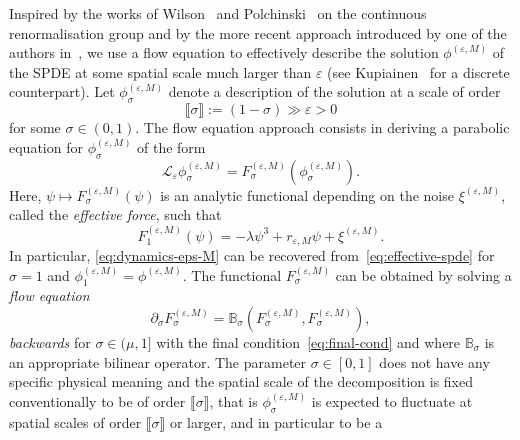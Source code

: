 \documentclass{article}
\numberwithin{equation}{section}
\newcommand{\assign}{:=}
\theoremstyle{plain}
\theoremstyle{definition}
\begin{document}
Inspired by the works of
Wilson~{\cite{wilson1971renormalization,wilson1974renormalization}} and
Polchinski~{\cite{polchinskiRenormalizationEffectiveLagrangians1984}} on the
continuous renormalisation group and by the more recent approach introduced by
one of the authors
in~{\cite{duchFlowEquationApproach2021,duchRenormalizationSingularElliptic2022}},
we use a flow equation to effectively describe the solution
$\phi^{(\varepsilon, M)}$ of the SPDE at some spatial scale much larger than
$\varepsilon$ (see Kupiainen~{\cite{kupiainen2016renormalization}} for a
discrete counterpart). Let $\phi_{\sigma}^{(\varepsilon, M)}$ denote a
description of the solution at a scale of order
\[ \llbracket \sigma \rrbracket  \assign (1 - \sigma) \gg \varepsilon > 0 \]
for some $\sigma \in (0, 1)$. The flow equation approach consists in deriving
a parabolic equation for $\phi^{(\varepsilon, M)}_{\sigma}$ of the form
\begin{equation}
  \mathcal{L}_{\varepsilon} \phi^{(\varepsilon, M)}_{\sigma} =
  F_{\sigma}^{(\varepsilon, M)} (\phi^{(\varepsilon, M)}_{\sigma}) .
  \label{eq:effective-spde}
\end{equation}
Here, $\psi \mapsto F_{\sigma}^{(\varepsilon, M)} (\psi)$ is an analytic
functional depending on the noise $\xi^{(\varepsilon, M)}$, called the
\textit{effective force}, such that
\begin{equation}
  F_1^{(\varepsilon, M)} (\psi) = - \lambda \psi^3 + r_{\varepsilon, M} \psi +
  \xi^{(\varepsilon, M)} . \label{eq:final-cond}
\end{equation}
In particular, \eqref{eq:dynamics-eps-M} can be recovered
from~\eqref{eq:effective-spde} for $\sigma = 1$ and $\phi^{(\varepsilon, M)}_1
= \phi^{(\varepsilon, M)}$. The functional $F_{\sigma}^{(\varepsilon, M)}$ can
be obtained by solving a \textit{flow equation}
\begin{equation}
  \partial_{\sigma} F_{\sigma}^{(\varepsilon, M)} =\mathbb{B}_{\sigma}
  (F_{\sigma}^{(\varepsilon, M)}, F_{\sigma}^{(\varepsilon, M)}),
  \label{eq:flow-intro}
\end{equation}
\textit{backwards} for $\sigma \in (\mu, 1]$ with the final
condition~\eqref{eq:final-cond} and where $\mathbb{B}_{\sigma}$ is an
appropriate bilinear operator. The parameter $\sigma \in [0, 1]$ does not have
any specific physical meaning and the spatial scale of the decomposition is
fixed conventionally to be of order $\llbracket \sigma \rrbracket$, that is
$\phi_{\sigma}^{(\varepsilon, M)}$ is expected to fluctuate at spatial scales
of order $\llbracket \sigma \rrbracket$ or larger, and in particular to be a
\end{document}
